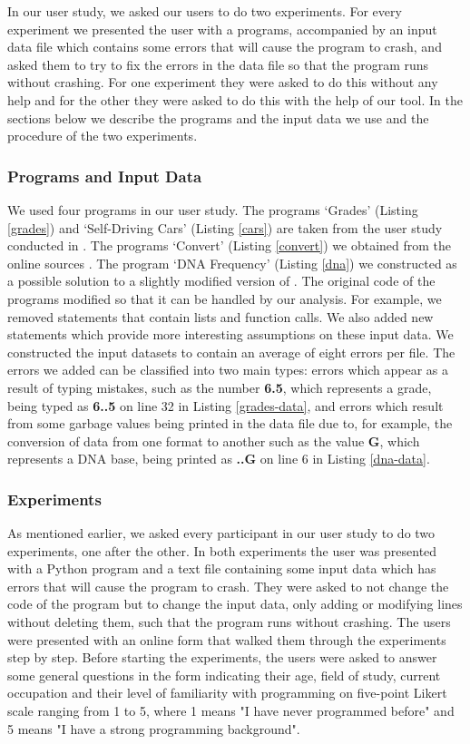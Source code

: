 \documentclass[10pt]{report}
\begin{document}
In our user study, we asked our users to do two experiments. For every experiment we presented the user with a programs, accompanied by an input data file which contains some errors that will cause the program to crash, and asked them to try to fix the errors in the data file so that the program runs without crashing. For one experiment they were asked to do this without any help and for the other they were asked to do this with the help of our tool. In the sections below we describe the programs and the input data we use and the procedure of the two experiments.

\subsubsection{Programs and Input Data}

We used four programs in our user study. The programs `Grades' (Listing \ref{grades}) and `Self-Driving Cars' (Listing \ref{cars}) are taken from the user study conducted in \cite{madelin}. The programs `Convert' (Listing \ref{convert}) we obtained from the online sources \cite{convert}. The program `DNA Frequency' (Listing \ref{dna}) we constructed as a possible solution to a slightly modified version of \cite{dna}. The original code of the programs modified so that it can be handled by our analysis. For example, we removed statements that contain lists and function calls. We also added new statements which provide more interesting assumptions on these input data. We constructed the input datasets to contain an average of eight errors per file. The errors we added can be classified into two main types: errors which appear as a result of typing mistakes, such as the number \textbf{6.5}, which represents a grade, being typed as \textbf{6..5} on line 32 in Listing \ref{grades-data}, and errors which result from some garbage values being printed in the data file due to, for example, the conversion of data from one format to another such as the value \textbf{G}, which represents a DNA base, being printed as \textbf{..G} on line 6 in Listing \ref{dna-data}.   \\ 

\subsubsection{Experiments}
As mentioned earlier, we asked every participant in our user study to do two experiments, one after the other. In both experiments the user was presented with a Python program and a text file containing some input data which has errors that will cause the program to crash. They were asked to not change the code of the program but to change the input data, only adding or modifying lines without deleting them, such that the program runs without crashing. The users were presented with an online form that walked them through the experiments step by step. Before starting the experiments, the users were asked to answer some general questions in the form indicating their age, field of study, current occupation and their level of familiarity with programming on five-point Likert scale ranging from 1 to 5, where 1 means "I have never programmed before" and 5 means "I have a strong programming background".  
\end{document}
